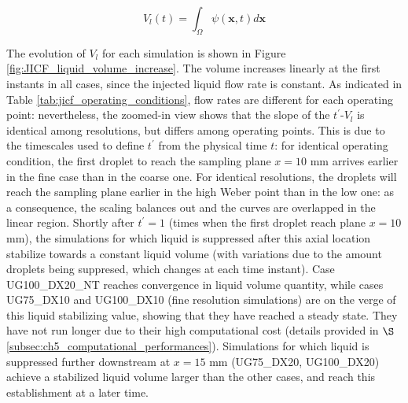 \begin{equation}
\label{eq:liquid_volume_from_levelset_definition}
V_l \left ( t \right) = \int_{\Omega} \psi \left( \textbf{x}, t \right) d\textbf{x}
\end{equation}

The evolution of $V_l$ for each simulation is shown in 
Figure \ref{fig:JICF_liquid_volume_increase}. The volume increases linearly at the first instants in all cases, since the injected liquid flow rate is constant. As indicated in Table \ref{tab:jicf_operating_conditions}, flow rates are different for each operating point: nevertheless, the zoomed-in view shows that the slope of the $t^{\prime}$-$V_l$ is identical among resolutions, but differs among operating points. This is due to the timescales used to define $t^{\prime}$ from the physical time $t$: for identical operating condition, the first droplet to reach the sampling plane $x = 10$ mm arrives earlier in the fine case than in the coarse one. For identical resolutions, the droplets will reach the sampling plane earlier in the high Weber point than in the low one: as a consequence, the scaling balances out and the curves are overlapped in the linear region. Shortly after $t^{\prime} = 1$ (times when the first droplet reach plane $x = 10$ mm), the simulations for which liquid is suppressed after this axial location stabilize towards a constant liquid volume (with variations due to the amount droplets being suppresed, which changes at each time instant). Case UG100\_DX20\_NT reaches convergence in liquid volume quantity, while cases UG75\_DX10 and UG100\_DX10 (fine resolution simulations) are on the verge of this liquid stabilizing value, showing that they have reached a steady state. They have not run longer due to their high computational cost (details provided in $\S$\ref{subsec:ch5_computational_performances}). Simulations for which liquid is suppressed further downstream at $x = 15$ mm (UG75\_DX20, UG100\_DX20) achieve a stabilized liquid volume larger than the other cases, and reach this establishment at a later time.


